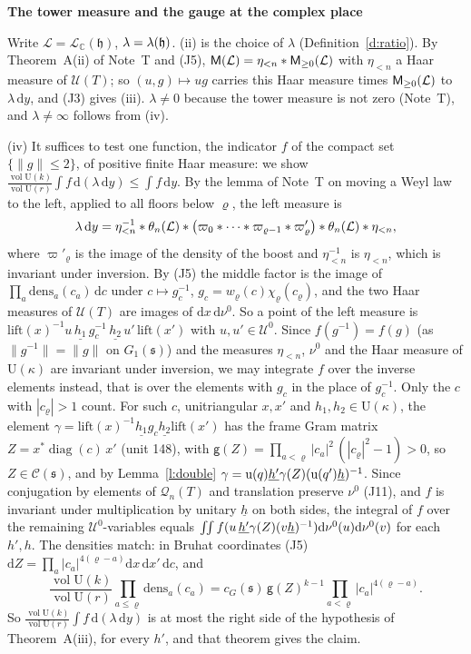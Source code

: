 \documentclass[11pt,a4paper]{article}
\makeatletter
\newcommand{\sect}[2]{\refstepcounter{section}\label{#2}\par\addvspace{19pt plus 4pt minus 2pt}\Needspace{7\baselineskip}%
  \noindent\llap{{\fontsize{13.2}{16}\selectfont\bfseries\color{inkfaint}\thesection}\hspace{9pt}}%
  {\fontsize{13.2}{16}\selectfont\bfseries\color{ink}#1}\par\nopagebreak\vspace{-1pt}}
\theoremstyle{plainx}
\theoremstyle{uprightx}
\renewenvironment{proof}[1][Proof]{\par\pushQED{\qed}\normalfont\topsep0pt\partopsep0pt
  \trivlist\item[\hskip\labelsep\itshape #1.]\ignorespaces}{\popQED\endtrivlist\@endpefalse}
\newcommand{\cL}{\mathcal{L}}
\newcommand{\CC}{\mathbb{C}}
\newcommand{\dd}{\mathrm{d}}
\newcommand{\Ql}[2]{\mathcal{Q}_{#1}(#2)}
\newcommand{\UT}[1]{\mathcal{U}(#1)}
\newcommand{\wl}[2]{w_{#1}(#2)}
\newcommand{\etab}[1]{\eta_{<#1}}
\newcommand{\vol}{\operatorname{vol}}
\newcommand{\cLC}[1]{\mathcal{L}_{\CC}(#1)}
\newcommand{\Gone}[1]{G_1(#1)}
\newcommand{\volU}[1]{\vol\mathrm{U}(#1)}
\newcommand{\cellc}[1]{c_G(#1)}
\newcommand{\boost}[2]{\chi_{#1}(#2)}
\newcommand{\Inp}[1]{\textup{(#1)}}
\newcommand{\emb}[1]{\underline{#1}}
\newcommand{\uq}[1]{\mathrm{u}(#1)}
\newcommand{\muz}{\nu^{0}}
\newcommand{\gd}[1]{\mathsf{g}(#1)}
\newcommand{\Ocell}[1]{\mathcal{C}(#1)}
\makeatother
\begin{document}
\sect{The tower measure and the gauge at the complex place}{s:haar}
\begin{proof}[Proof of Theorem B]
Write $\cL=\cLC{\mathfrak{h}}$, $\lambda=\lambda(\mathfrak{h})$. (ii) is the choice of $\lambda$
(Definition~\ref{d:ratio}). By Theorem~A(ii) of Note~T and \Inp{J5},
$\groupMeasure{\cL}=\etab{n}*\upperMeasure{\cL}{0}$ with $\etab{n}$ a Haar measure of $\UT{T}$; so
$(u,g)\mapsto ug$ carries this Haar measure times $\upperMeasure{\cL}{0}$ to $\lambda\,\dd y$, and \Inp{J3} gives
(iii). $\lambda\ne0$ because the tower measure is not zero (Note~T), and $\lambda\ne\infty$ follows from (iv).

(iv) It suffices to test one function, the indicator $f$ of the compact set $\{\|g\|\le2\}$, of positive finite
Haar measure: we show $\frac{\volU{k}}{\volU{r}}\int f\,\dd(\lambda\,\dd y)\le\int f\,\dd y$. By the lemma of Note~T on moving a Weyl law to the left, applied to all floors below $\varrho$, the left measure is
\[\lambda\,\dd y=\etab{n}^{-1}*\floorMeasure{\cL}{n}*\bigl(\varpi_0*\dots*\varpi_{\varrho-1}*\varpi'_\varrho\bigr)*\floorMeasure{\cL}{n}*\etab{n},\]
where $\varpi'_\varrho$ is the image of the density of the boost and $\etab{n}^{-1}$ is $\etab{n}$, which is
invariant under inversion. By \Inp{J5} the middle factor is the image of $\prod_a\mathrm{dens}_a(c_a)\,\dd c$ under
$c\mapsto g_c^{-1}$, $g_c=\wl{\varrho}{c}\boost{\varrho}{c_\varrho}$, and the two Haar measures of $\UT{T}$ are images
of $\dd x\,\dd\muz$. So a point of the left measure is
$\mathrm{lift}(x)^{-1}u\,\emb{h_1}\,g_c^{-1}\,\emb{h_2}\,u'\,\mathrm{lift}(x')$ with $u,u'\in\mathcal{U}^0$. Since
$f(g^{-1})=f(g)$ (as $\|g^{-1}\|=\|g\|$ on $\Gone{\mathfrak{s}}$) and the measures $\etab{n}$, $\muz$ and the Haar
measure of $\mathrm{U}(\kappa)$ are invariant under inversion, we may integrate $f$ over the inverse elements
instead, that is over the elements with $g_c$ in the place of $g_c^{-1}$. Only the $c$ with $|c_\varrho|>1$ count. For such $c$, unitriangular $x,x'$ and
$h_1,h_2\in\mathrm{U}(\kappa)$, the element $\gamma=\mathrm{lift}(x)^{-1}\emb{h_1}g_c\emb{h_2}\mathrm{lift}(x')$ has
the frame Gram matrix $Z=x^{*}\operatorname{diag}(c)\,x'$ (unit 148), with
$\gd{Z}=\prod_{a<\varrho}|c_a|^{2}\,(|c_\varrho|^{2}-1)>0$, so $Z\in\Ocell{\mathfrak{s}}$, and by
Lemma~\ref{l:double} $\gamma=\uq{q}\emb{h'}\gramSection{Z}(\uq{q'}\emb{h})^{-1}$. Since conjugation by elements of
$\Ql{n}{T}$ and translation preserve $\muz$ \Inp{J11}, and $f$ is invariant under multiplication by unitary
$\emb{h}$ on both sides, the integral of $f$ over the remaining $\mathcal{U}^0$-variables equals
$\iint f(u\,\emb{h'}\gramSection{Z}(v\emb{h})^{-1})\dd\muz(u)\dd\muz(v)$ for each $h',h$. The densities match: in
Bruhat coordinates \Inp{J5} $\dd Z=\prod_a|c_a|^{4(\varrho-a)}\dd x\,\dd x'\,\dd c$, and
\[\frac{\volU{k}}{\volU{r}}\prod_{a\le\varrho}\mathrm{dens}_a(c_a)=\cellc{\mathfrak{s}}\,\gd{Z}^{k-1}\prod_{a<\varrho}|c_a|^{4(\varrho-a)}.\]
So $\frac{\volU{k}}{\volU{r}}\int f\,\dd(\lambda\,\dd y)$ is at most the right side of the hypothesis of
Theorem~A(iii), for every $h'$, and that theorem gives the claim.
\end{proof}
\end{document}
